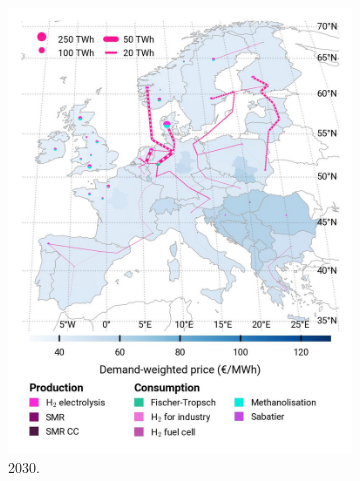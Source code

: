 \documentclass[preprint,12pt,sort&compress]{elsarticle}
\begin{document}
\begin{figure}[htbp]
  \centering
  \begin{subfigure}[t]{0.33\textwidth}
      \vspace{0pt}
      \includegraphics[width=1\textwidth]{maps/pcipmi/base_s_adm___2030-balance_map_H2}
      \caption{ 2030.}
      \label{fig:PCI_lt_2030_h2}
  \end{subfigure}
  \begin{subfigure}[t]{0.33\textwidth}
      \vspace{0pt}

\end{subfigure}
\end{figure}
\end{document}
